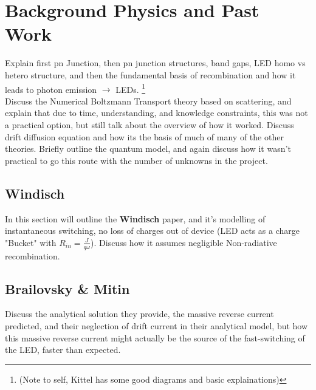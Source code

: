 \documentclass[titlepage]{article}
\begin{document}
\section{Background Physics and Past Work}
Explain first pn Junction, then pn junction structures, band gaps, LED homo vs hetero structure, and then the fundamental basis of recombination and how it leads to photon emission $\rightarrow$ LEDs. \footnote{(Note to self, Kittel has some good diagrams and basic explainations)}\\
Discuss the Numerical Boltzmann Transport theory based on scattering, and explain that due to time, understanding, and knowledge constraints, this was not a practical option, but still talk about the overview of how it worked.
Discuss drift diffusion equation and how its the basis of much of many of the other theories.
Briefly outline the quantum model, and again discuss how it wasn't practical to go this route with the number of unknowns in the project.
\subsection{Windisch}
In this section will outline the \textbf{Windisch} paper, and it's modelling of instantaneous switching, no loss of charges out of device (LED acts as a charge "Bucket" with $R_{in} = \frac{J}{q\omega} $). Discuss how it assumes negligible Non-radiative recombination.
\subsection{Brailovsky \& Mitin}
Discuss the analytical solution they provide, the massive reverse current predicted, and their neglection of drift current in their analytical model, but how this massive reverse current might actually be the source of the fast-switching of the LED, faster than expected.
\end{document}
